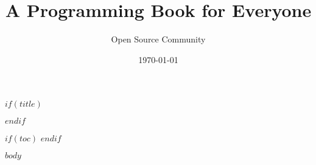 \documentclass[12pt,a4paper]{book}
\title{\Huge \booktitle\\\large A Programming Book for Everyone}
\author{Open Source Community}
\date{\today}
\begin{document}
$if(title)$
\maketitle
$endif$

$if(toc)$
\tableofcontents
\clearpage
$endif$

$body$
\end{document}
